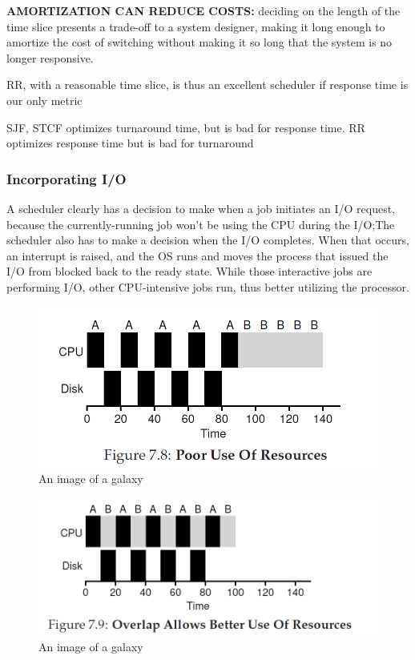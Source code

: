 \documentclass{article}
\begin{document}
\textbf{AMORTIZATION CAN REDUCE COSTS: }deciding
on the length of the time slice presents a trade-off to a system designer,
making it long enough to amortize the cost of switching without
making it so long that the system is no longer responsive.

{\color{red}RR, with a reasonable time slice, is thus an excellent scheduler if response
time is our only metric}

{\color{red} SJF, STCF optimizes turnaround time, but is bad for response time. RR optimizes response time but is bad for turnaround}

\subsubsection{Incorporating I/O}
A scheduler clearly has a decision to make when a job initiates an I/O
request, because the currently-running job won’t be using the CPU during
the I/O;The scheduler also has to make a decision when the I/O completes.
When that occurs, an interrupt is raised, and the OS runs and moves
the process that issued the I/O from blocked back to the ready state.
While those interactive jobs are performing
I/O, other CPU-intensive jobs run, thus better utilizing the processor.

\begin{figure}[H]
    \centering
    \includegraphics[width=13cm] {fig7.8.png}
    \caption{An image of a galaxy}
    \label{fig:galaxy}
\end{figure}
\begin{figure}[H]
    \centering
    \includegraphics[width=13cm] {fig7.9.png}
    \caption{An image of a galaxy}
    \label{fig:galaxy}
\end{figure}
\pagebreak
\end{document}
